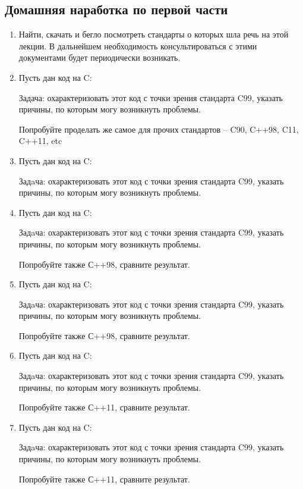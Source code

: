 \documentclass[a4paper,12pt,oneside]{article}
\begin{document}
\subsection{Домашняя наработка по первой части}
\begin{enumerate}
\item
Найти, скачать и бегло посмотреть стандарты о которых шла речь на этой лекции. В дальнейшем необходимость консультироваться с этими документами будет периодически возникать.
\item
Пусть дан код на C:



Задача: охарактеризовать этот код с точки зрения стандарта C99, указать причины, по которым могу возникнуть проблемы.

Попробуйте проделать же самое для прочих стандартов -- C90, C++98, C11, C++11, etc

\item
Пусть дан код на C:



Задaча: охарактеризовать этот код с точки зрения стандарта C99, указать причины, по которым могу возникнуть проблемы.

\item
Пусть дан код на C:



Задaча: охарактеризовать этот код с точки зрения стандарта C99, указать причины, по которым могу возникнуть проблемы.

Попробуйте также С++98, сравните результат.

\item
Пусть дан код на C:



Задaча: охарактеризовать этот код с точки зрения стандарта C99, указать причины, по которым могу возникнуть проблемы. 

Попробуйте также С++98, сравните результат.

\item
Пусть дан код на C:



Задaча: охарактеризовать этот код с точки зрения стандарта C99, указать причины, по которым могу возникнуть проблемы.

Попробуйте также С++11, сравните результат.

\item
Пусть дан код на C:



Задaча: охарактеризовать этот код с точки зрения стандарта C99, указать причины, по которым могу возникнуть проблемы.

Попробуйте также С++11, сравните результат.

\end{enumerate}
\end{document}

